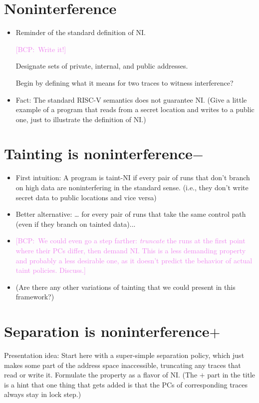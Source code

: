 \documentclass[conference]{IEEEtran}
\newif\ifdraft \drafttrue
\newcommand{\bcp}[1]{\ifdraft\textcolor{violet}{{[BCP:~#1]}}\fi}
\begin{document}
\section{Noninterference}

\begin{itemize}
\item Reminder of the standard definition of NI.

\bcp{Write it!}

Designate sets of private, internal, and public addresses.

Begin by defining what it means for two traces to witness interference?

\item Fact: The standard RISC-V semantics does not guarantee NI.  (Give a
little example of a program that reads from a secret location and writes to
a public one, just to illustrate the definition of NI.)
\end{itemize}

\section{Tainting is noninterference$-$}

\begin{itemize}
\item First intuition: A program is taint-NI if every pair of runs that don’t
branch on high data are noninterfering in the standard sense.  (i.e., they
don't write secret data to public locations and vice versa)
\item Better alternative: … for every pair of runs that take the same control path (even if they branch on tainted data)...
\item \bcp{We could even go a step farther: {\em truncate} the runs at the
  first point where their PCs differ, then demand NI.  This is a less
  demanding property and probably a less desirable one, as it doesn't
  predict the behavior of actual taint policies.  Discuss.}
\item (Are there any other variations of tainting that we could present in
this framework?)
\end{itemize}

\section{Separation is noninterference$+$}

Presentation idea: Start here with a super-simple separation policy, which
just makes some part of the address space inaccessible, truncating any
traces that read or write it.  Formulate the property as a flavor of NI.
(The $+$ part in the title is a hint that one thing that gets added is that
the PCs of corresponding traces always stay in lock step.)
\end{document}
